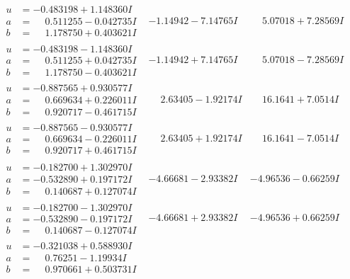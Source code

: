 \documentclass[1p]{elsarticle_modified}
\theoremstyle{definition}
\begin{document}
$$\begin{array}{c|c|c}
\begin{aligned}
u &= -0.483198 + 1.148360 I \\
a &= \phantom{-}0.511255 - 0.042735 I \\
b &= \phantom{-}1.178750 + 0.403621 I\end{aligned}
 & -1.14942 - 7.14765 I & \phantom{-}5.07018 + 7.28569 I \\ \hline\begin{aligned}
u &= -0.483198 - 1.148360 I \\
a &= \phantom{-}0.511255 + 0.042735 I \\
b &= \phantom{-}1.178750 - 0.403621 I\end{aligned}
 & -1.14942 + 7.14765 I & \phantom{-}5.07018 - 7.28569 I \\ \hline\begin{aligned}
u &= -0.887565 + 0.930577 I \\
a &= \phantom{-}0.669634 + 0.226011 I \\
b &= \phantom{-}0.920717 - 0.461715 I\end{aligned}
 & \phantom{-}2.63405 - 1.92174 I & \phantom{-}16.1641 + 7.0514 I \\ \hline\begin{aligned}
u &= -0.887565 - 0.930577 I \\
a &= \phantom{-}0.669634 - 0.226011 I \\
b &= \phantom{-}0.920717 + 0.461715 I\end{aligned}
 & \phantom{-}2.63405 + 1.92174 I & \phantom{-}16.1641 - 7.0514 I \\ \hline\begin{aligned}
u &= -0.182700 + 1.302970 I \\
a &= -0.532890 + 0.197172 I \\
b &= \phantom{-}0.140687 + 0.127074 I\end{aligned}
 & -4.66681 - 2.93382 I & -4.96536 - 0.66259 I \\ \hline\begin{aligned}
u &= -0.182700 - 1.302970 I \\
a &= -0.532890 - 0.197172 I \\
b &= \phantom{-}0.140687 - 0.127074 I\end{aligned}
 & -4.66681 + 2.93382 I & -4.96536 + 0.66259 I \\ \hline\begin{aligned}
u &= -0.321038 + 0.588930 I \\
a &= \phantom{-}0.76251 - 1.19934 I \\
b &= \phantom{-}0.970661 + 0.503731 I\end{aligned}

\end{array}$$
\end{document}

